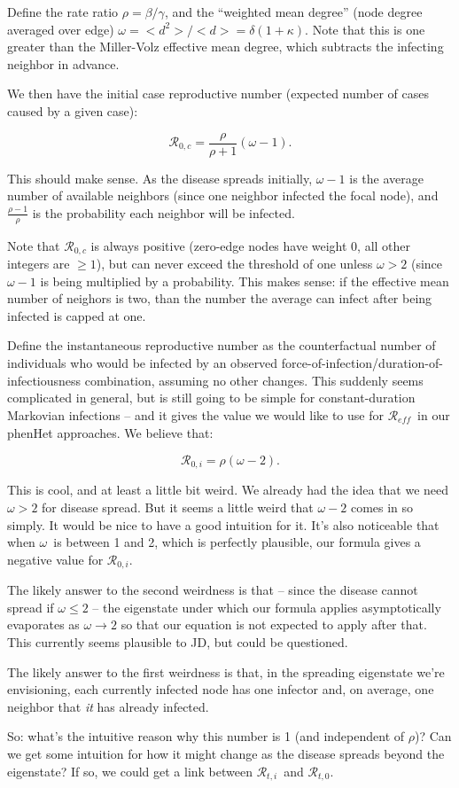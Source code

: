 \documentclass[12pt]{article}
\begin{document}
\newcommand{\Rx}[1]{\ensuremath{\mathcal{R}_{#1}}}
\newcommand{\emd}{\ensuremath{\omega}}

Define the rate ratio $\rho = \beta/\gamma$, and the “weighted mean degree” (node degree averaged over edge) $\emd = <d^2>/<d> = \delta(1+
\kappa)$. Note that this is one greater than the Miller-Volz effective mean degree, which subtracts the infecting neighbor in advance.

We then have the initial case reproductive number (expected number of cases caused by a given case):

$$ \Rx{0,c} = \frac{\rho}{\rho+1}(\emd-1). $$

This should make sense. As the disease spreads initially, $\emd - 1$ is the average number of available neighbors (since one neighbor infected the focal node), and $\frac{\rho-1}{\rho}$ is the probability each neighbor will be infected. 

Note that \Rx{0,c} is always positive (zero-edge nodes have weight 0, all other integers are $\geq1$), but can never exceed the threshold of one unless $\emd>2$ (since $\emd-1$ is being multiplied by a probability. This makes sense: if the effective mean number of neighors is two, than the number the average can infect after being infected is capped at one.

Define the instantaneous reproductive number as the counterfactual number of individuals who would be infected by an observed force-of-infection/duration-of-infectiousness combination, assuming no other changes. This suddenly seems complicated in general, but is still going to be simple for constant-duration Markovian infections -- and it gives the value we would like to use for \Rx{\mathit{eff}}\ in our phenHet approaches. We believe that:

$$ \Rx{0,i} = \rho(\emd-2).$$

This is cool, and at least a little bit weird. We already had the idea that we need $\emd>2$ for disease spread. But it seems a little weird that $\emd-2$ comes in so simply. It would be nice to have a good intuition for it. It's also noticeable that when \emd\ is between 1 and 2, which is perfectly plausible, our formula gives a negative value for \Rx{0,i}.

The likely answer to the second weirdness is that -- since the disease cannot spread if $\emd\leq2$ -- the eigenstate under which our formula applies asymptotically evaporates as $\emd\to2$ so that our equation is not expected to apply after that. This currently seems plausible to JD, but could be questioned.

The likely answer to the first weirdness is that, in the spreading eigenstate we're envisioning, each currently infected node has one infector and, on average, one neighbor that \emph{it} has already infected.

So: what's the intuitive reason why this number is 1 (and independent of $\rho$)? Can we get some intuition for how it might change as the disease spreads beyond the eigenstate? If so, we could get a link between \Rx{t,i}\ and \Rx{t,0}.
\end{document}
